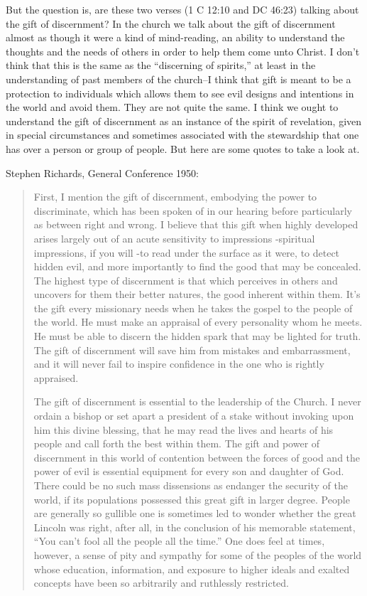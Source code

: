 \begin{enumerate}
But the question is, are these two verses (1 C 12:10 and DC 46:23) talking about the gift of discernment? In the church we talk about the gift of discernment almost as though it were a kind of mind-reading, an ability to understand the thoughts and the needs of others in order to help them come unto Christ. I don't think that this is the same as the ``discerning of spirits,'' at least in the understanding of past members of the church--I think that gift is meant to be a protection to individuals which allows them to see evil designs and intentions in the world and avoid them. They are not quite the same. I think we ought to understand the gift of discernment as an instance of the spirit of revelation, given in special circumstances and sometimes associated with the stewardship that one has over a person or group of people. But here are some quotes to take a look at.

Stephen Richards, General Conference 1950:

\begin{quotation}
First, I mention the gift of discernment, embodying the power to discriminate, which has been spoken of in our hearing before particularly as between right and wrong. I believe that this gift when highly developed arises largely out of an acute sensitivity to impressions -spiritual impressions, if you will -to read under the surface as it were, to detect hidden evil, and more importantly to find the good that may be concealed. The highest type of discernment is that which perceives in others and uncovers for them their better natures, the good inherent within them. It's the gift every missionary needs when he takes the gospel to the people of the world. He must make an appraisal of every personality whom he meets. He must be able to discern the hidden spark that may be lighted for truth. The gift of discernment will save him from mistakes and embarrassment, and it will never fail to inspire confidence in the one who is rightly appraised.

The gift of discernment is essential to the leadership of the Church. I never ordain a bishop or set apart a president of a stake without invoking upon him this divine blessing, that he may read the lives and hearts of his people and call forth the best within them. The gift and power of discernment in this world of contention between the forces of good and the power of evil is essential equipment for every son and daughter of God. There could be no such mass dissensions as endanger the security of the world, if its populations possessed this great gift in larger degree. People are generally so gullible one is sometimes led to wonder whether the great Lincoln was right, after all, in the conclusion of his memorable statement, ``You can't fool all the people all the time.'' One does feel at times, however, a sense of pity and sympathy for some of the peoples of the world whose education, information, and exposure to higher ideals and exalted concepts have been so arbitrarily and ruthlessly restricted.


\end{quotation}
\end{enumerate}
